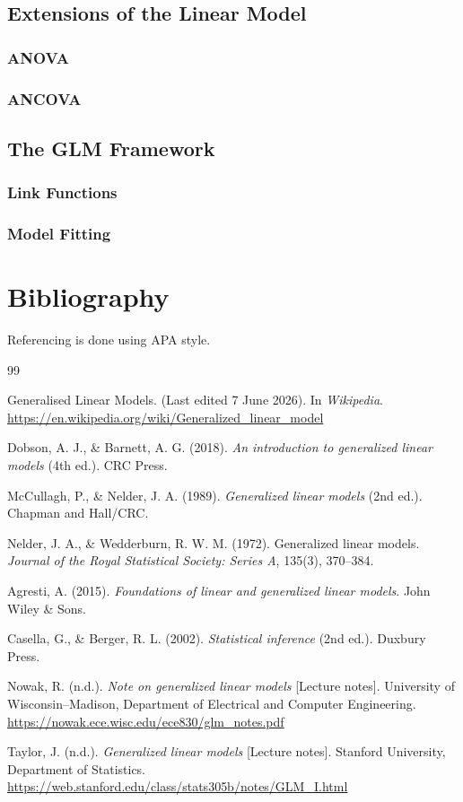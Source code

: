 \documentclass[12pt,a4paper]{report}
\begin{document}
\section{Extensions of the Linear Model}
\subsection{ANOVA}
\subsection{ANCOVA}

\section{The GLM Framework}
\subsection{Link Functions}
\subsection{Model Fitting}

\chapter*{Bibliography}

Referencing is done using APA style.

\begin{thebibliography}{99}\setlength{\itemsep}{0.5em}

 Generalised Linear Models. (Last edited 7 June 2026). In \textit{Wikipedia}. \url{https://en.wikipedia.org/wiki/Generalized_linear_model}

 Dobson, A. J., \& Barnett, A. G. (2018). \textit{An introduction to generalized linear models} (4th ed.). CRC Press.

 McCullagh, P., \& Nelder, J. A. (1989). \textit{Generalized linear models} (2nd ed.). Chapman and Hall/CRC.

 Nelder, J. A., \& Wedderburn, R. W. M. (1972). Generalized linear models. \textit{Journal of the Royal Statistical Society: Series A}, 135(3), 370--384.

 Agresti, A. (2015). \textit{Foundations of linear and generalized linear models}. John Wiley \& Sons.

 Casella, G., \& Berger, R. L. (2002). \textit{Statistical inference} (2nd ed.). Duxbury Press.

 Nowak, R. (n.d.). \textit{Note on generalized linear models} [Lecture notes]. University of Wisconsin--Madison, Department of Electrical and Computer Engineering. \url{https://nowak.ece.wisc.edu/ece830/glm_notes.pdf}

 Taylor, J. (n.d.). \textit{Generalized linear models} [Lecture notes]. Stanford University, Department of Statistics. \url{https://web.stanford.edu/class/stats305b/notes/GLM_I.html}

\end{thebibliography}
\end{document}
